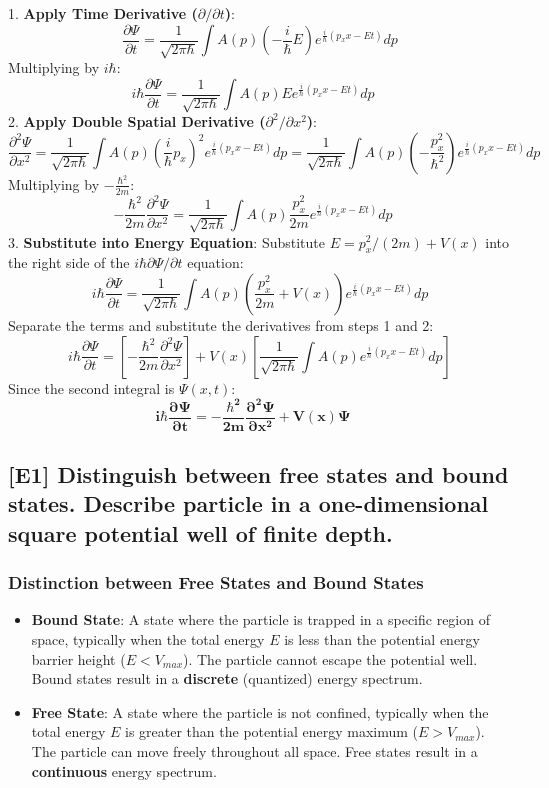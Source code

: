 \documentclass[12pt]{article}
\begin{document}
1.  \textbf{Apply Time Derivative ($\partial/\partial t$)}:
    $$
    \frac{\partial\Psi}{\partial t} = \frac{1}{\sqrt{2\pi\hbar}} \int A(p) \left(-\frac{i}{\hbar} E\right) e^{\frac{i}{\hbar}(p_x x - E t)} dp
    $$
    Multiplying by $i\hbar$:
    $$
    i\hbar \frac{\partial\Psi}{\partial t} = \frac{1}{\sqrt{2\pi\hbar}} \int A(p) E e^{\frac{i}{\hbar}(p_x x - E t)} dp \quad \text{}
    $$
2.  \textbf{Apply Double Spatial Derivative ($\partial^2/\partial x^2$)}:
    $$
    \frac{\partial^2\Psi}{\partial x^2} = \frac{1}{\sqrt{2\pi\hbar}} \int A(p) \left(\frac{i}{\hbar} p_x\right)^2 e^{\frac{i}{\hbar}(p_x x - E t)} dp = \frac{1}{\sqrt{2\pi\hbar}} \int A(p) \left(-\frac{p_x^2}{\hbar^2}\right) e^{\frac{i}{\hbar}(p_x x - E t)} dp \quad \text{}
    $$
    Multiplying by $-\frac{\hbar^2}{2m}$:
    $$
    -\frac{\hbar^2}{2m} \frac{\partial^2\Psi}{\partial x^2} = \frac{1}{\sqrt{2\pi\hbar}} \int A(p) \frac{p_x^2}{2m} e^{\frac{i}{\hbar}(p_x x - E t)} dp \quad \text{}
    $$
3.  \textbf{Substitute into Energy Equation}:
    Substitute $E = p_x^2/(2m) + V(x)$ into the right side of the $i\hbar \partial\Psi/\partial t$ equation:
    $$
    i\hbar \frac{\partial\Psi}{\partial t} = \frac{1}{\sqrt{2\pi\hbar}} \int A(p) \left( \frac{p_x^2}{2m} + V(x) \right) e^{\frac{i}{\hbar}(p_x x - E t)} dp
    $$
    Separate the terms and substitute the derivatives from steps 1 and 2:
    $$
    i\hbar \frac{\partial\Psi}{\partial t} = \left[-\frac{\hbar^2}{2m} \frac{\partial^2\Psi}{\partial x^2}\right] + V(x)\left[\frac{1}{\sqrt{2\pi\hbar}} \int A(p) e^{\frac{i}{\hbar}(p_x x - E t)} dp\right]
    $$
    Since the second integral is $\Psi(x, t)$:
    $$
    \mathbf{i\hbar \frac{\partial\Psi}{\partial t} = -\frac{\hbar^2}{2m} \frac{\partial^2\Psi}{\partial x^2} + V(x)\Psi} \quad \text{}
    $$

\subsection{[E1] Distinguish between free states and bound states. Describe particle in a one-dimensional square potential well of finite depth.}

\subsubsection*{Distinction between Free States and Bound States}
\begin{itemize}
    \item \textbf{Bound State}: A state where the particle is trapped in a specific region of space, typically when the total energy $E$ is less than the potential energy barrier height ($E < V_{max}$). The particle cannot escape the potential well. Bound states result in a \textbf{discrete} (quantized) energy spectrum.
    \item \textbf{Free State}: A state where the particle is not confined, typically when the total energy $E$ is greater than the potential energy maximum ($E > V_{max}$). The particle can move freely throughout all space. Free states result in a \textbf{continuous} energy spectrum.
\end{itemize}
\end{document}
